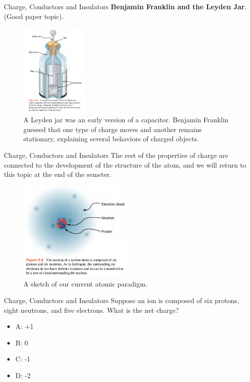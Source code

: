 \documentclass{beamer}
\begin{document}
\begin{frame}{Charge, Conductors and Insulators}
\textbf{Benjamin Franklin and the Leyden Jar}.  (Good paper topic).
\begin{figure}
\centering
\includegraphics[width=0.3\textwidth]{figures/leyden.png}
\caption{\label{fig:leyden} A Leyden jar was an early version of a capacitor.  Benjamin Franklin guessed that one type of charge moves and another remains stationary, explaining several behaviors of charged objects.}
\end{figure}
\end{frame}

\begin{frame}{Charge, Conductors and Insulators}
The rest of the properties of charge are connected to the development of the structure of the atom, and we will return to this topic at the end of the semeter.
\begin{figure}
\centering
\includegraphics[width=0.5\textwidth]{figures/atom.png}
\caption{\label{fig:atom} A sketch of our current atomic paradigm.}
\end{figure}
\end{frame}

\begin{frame}{Charge, Conductors and Insulators}
Suppose an ion is composed of six protons, eight neutrons, and five electrons.  What is the net charge?
\begin{itemize}
\item A: +1
\item B: 0
\item C: -1
\item D: -2
\end{itemize}
\end{frame}
\end{document}
